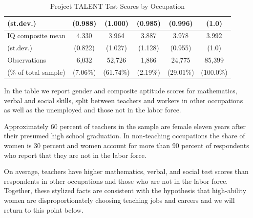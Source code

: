 \documentclass[onehalfspacing,11pt]{article}
\begin{document}
\begin{table}[h!]
\begin{tabular}{lccccc}
			\quad (st.dev.) & (0.988) & (1.000) & (0.985) & (0.996) & (1.0)\\
			\midrule
			IQ composite mean & 4.330 & 3.964 & 3.887 & 3.978 & 3.992\\
			\quad (st.dev.) & (0.822) & (1.027) & (1.128) & (0.955) & (1.0)\\
			\midrule
			Observations & 6,032 & 52,726 & 1,866 & 24,775 & 85,399\\
			\quad (\% of total sample) & (7.06\%) & (61.74\%) & (2.19\%) & (29.01\%) &(100.0\%)\\
			\bottomrule
		\end{tabular}
		\caption{Project TALENT Test Scores by Occupation}
		\label{tab:PTscores}
	\end{table}
	
	In the table %
	we report gender and composite aptitude scores for mathematics, verbal and social skills, split between teachers and workers in other occupations as well as the unemployed and those not in the labor force. 
	
	
	
	Approximately 60 percent of teachers in the sample are female eleven years after their presumed high school graduation. In non-teaching occupations the share of women is 30 percent and women account for more than 90 percent of respondents who report that they are not in the labor force.
	
	On average, teachers have higher mathematics, verbal, and social test scores than respondents in other occupations and those who are not in the labor force. Together, these stylized facts are consistent with the hypothesis that high-ability women are disproportionately choosing teaching jobs and careers and we will return to this point below.
	
\end{document}
